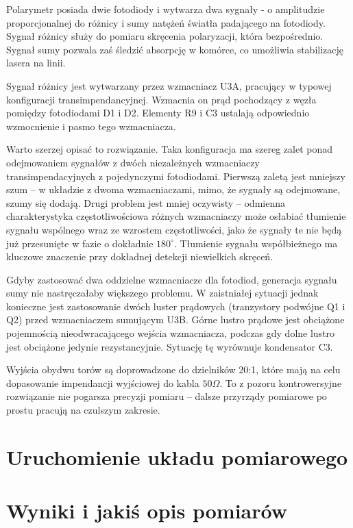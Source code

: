 \documentclass[a4paper,10pt]{article}
\begin{document}
Polarymetr posiada dwie fotodiody i wytwarza dwa sygnały - o amplitudzie proporcjonalnej do różnicy i sumy natężeń światła padającego na fotodiody.
Sygnał różnicy służy do pomiaru skręcenia polaryzacji, która bezpośrednio.  Sygnał sumy pozwala zaś śledzić absorpcję w komórce, co umożliwia stabilizację lasera na linii.

Sygnał różnicy jest wytwarzany przez wzmacniacz U3A, pracujący w typowej konfiguracji transimpendancyjnej. Wzmacnia on prąd pochodzący z węzła pomiędzy fotodiodami D1 i D2.
Elementy R9 i C3 ustalają odpowiednio wzmocnienie i pasmo tego wzmacniacza.

Warto szerzej opisać to rozwiązanie. Taka konfiguracja ma szereg zalet ponad odejmowaniem sygnałów z dwóch niezależnych wzmacniaczy transimpendacyjnych z pojedynczymi fotodiodami.
Pierwszą zaletą jest mniejszy szum -- w układzie z dwoma wzmacniaczami, mimo, że sygnały są odejmowane, szumy się dodają. Drugi problem jest mniej oczywisty -- odmienna charakterystyka częstotliwościowa różnych wzmacniaczy może osłabiać tłumienie sygnału wspólnego wraz ze wzrostem częstotliwości, jako że sygnały te nie będą już przesunięte w fazie o dokładnie $180^{\circ}$. Tłumienie sygnału współbieżnego ma kluczowe znaczenie przy dokładnej detekcji niewielkich skręceń.

Gdyby zastosować dwa oddzielne wzmacniacze dla fotodiod, generacja sygnału sumy nie nastręczałaby większego problemu. W zaistniałej sytuacji jednak konieczne jest zastosowanie dwóch luster prądowych (tranzystory podwójne Q1 i Q2) przed wzmacniaczem sumującym U3B. Górne lustro prądowe jest obciążone pojemnością nieodwracającego wejścia wzmacniacza, podczas gdy dolne lustro jest obciążone jedynie rezystancyjnie. Sytuację tę wyrównuje kondensator C3. 

Wyjścia obydwu torów są doprowadzone do dzielników 20:1, które mają na celu dopasowanie impendancji wyjściowej do kabla $50\Omega$. To z pozoru kontrowersyjne rozwiązanie nie pogarsza precyzji pomiaru -- dalsze przyrządy pomiarowe po prostu pracują na czulszym zakresie.

\section{Uruchomienie układu pomiarowego}


\section{Wyniki i jakiś opis pomiarów}
\end{document}
